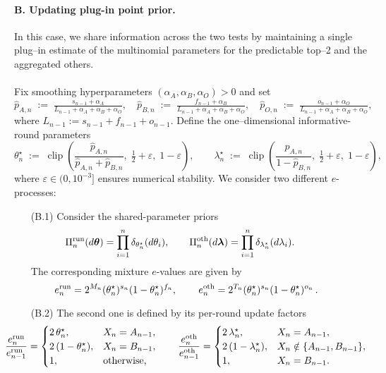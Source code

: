 \paragraph{B. Updating plug-in point prior.}
In this case, we share information across the two tests by maintaining a {single} plug–in estimate of the multinomial parameters for the predictable top–2 and the aggregated others.
\\\\
Fix smoothing hyperparameters $(\alpha_A,\alpha_B,\alpha_O)>0$ and set
\[
\hat p_{A,n} \;:=\; \tfrac{s_{n-1}+\alpha_A}{L_{n-1}+\alpha_A+\alpha_B+\alpha_O},\quad
\hat p_{B,n} \;:=\; \tfrac{f_{n-1}+\alpha_B}{L_{n-1}+\alpha_A+\alpha_B+\alpha_O},\quad
\hat p_{O,n} \;:=\; \tfrac{o_{n-1}+\alpha_O}{L_{n-1}+\alpha_A+\alpha_B+\alpha_O},
\]
where $L_{n-1}:=s_{n-1}+f_{n-1}+o_{n-1}$.
Define the  one–dimensional informative-round parameters
\[
\theta^\star_n \;:=\; \operatorname{clip}\!\left(\frac{\hat p_{A,n}}{\hat p_{A,n}+\hat p_{B,n}},\; \tfrac12+\varepsilon,\; 1-\varepsilon\right),
\qquad
\lambda^\star_n \;:=\; \operatorname{clip}\!\left(\frac{\hat p_{A,n}}{1-\hat p_{B,n}},\; \tfrac12+\varepsilon,\; 1-\varepsilon\right),
\]
where $\varepsilon\in(0,10^{-3}]$ ensures numerical stability.
We consider two different $e$-processes:
\begin{itemize}
    \item[(B.1)] Consider the shared-parameter priors
    \begin{align*}
\hspace{-30pt}\Pi_n^{\mathrm{run}}(d\bm\theta)&=\prod_{i=1}^n\delta_{\theta_n^\star}(d\theta_i),\qquad
\Pi_n^{\mathrm{oth}}(d\bm\lambda)=\prod_{i=1}^n\delta_{\lambda_n^\star}(d\lambda_i).
\end{align*}
    The corresponding mixture $e$-values are given by
\[
\hspace{-30pt}\,e^{\mathrm{run}}_n
= 2^{M_n}(\theta_n^\star)^{s_n}(1-\theta_n^\star)^{f_n},\qquad
{\,e^{\mathrm{oth}}_n
= 2^{T_n}(\theta_n^\star)^{s_n}(1-\theta_n^\star)^{o_n}\,}.
\]    
    \item[(B.2)] The second one is defined by its per-round update factors
    \[
\hspace{-30pt}\frac{e^{\mathrm{run}}_n}{e^{\mathrm{run}}_{n-1}}
=
\begin{cases}
2\,\theta^\star_n, & X_n=A_{n-1},\\
2\,(1-\theta^\star_n), & X_n=B_{n-1},\\
1, & \text{otherwise,}
\end{cases}
\qquad
\frac{e^{\mathrm{oth}}_n}{e^{\mathrm{oth}}_{n-1}}
=
\begin{cases}
2\,\lambda^\star_n, & X_n=A_{n-1},\\
2\,(1-\lambda^\star_n), & X_n\notin\{A_{n-1},B_{n-1}\},\\
1, & X_n=B_{n-1}.
\end{cases}
\]
\end{itemize}
